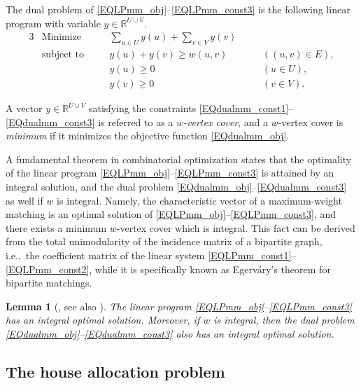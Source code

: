 \documentclass[11pt,a4paper,showkeys]{article}
\theoremstyle{plain}
\newtheorem{lemma}[theorem]{Lemma}
\theoremstyle{definition}
\newcommand{\RR}{{\mathbb{R}}}
\begin{document}
The dual problem of 
\eqref{EQLPmm_obj}--\eqref{EQLPmm_const3} is the following linear program with variable $y\in \RR^{U\cup V} $.
\begin{alignat}{3}
\label{EQdualmm_obj}
&\mbox{Minimize}    &\quad& \sum_{u\in U} y(u) + \sum_{v\in V} y(v)     && \\
\label{EQdualmm_const1}
&\mbox{subject to}  &\quad& y(u) + y(v) \ge w(u,v)                    &\quad& ((u,v)\in E),\\
\label{EQdualmm_const2}
&                   &\quad& y(u)\ge 0                                   &\quad& (u\in U), \\
\label{EQdualmm_const3}
&                   &\quad& y(v)\ge 0                                   &\quad& (v\in V).
\end{alignat}

A vector $y\in \RR^{U\cup V}$ satisfying the constraints \eqref{EQdualmm_const1}--\eqref{EQdualmm_const3} is referred to as a 
\emph{$w$-vertex cover}, 
and 
a $w$-vertex cover is \emph{minimum} if it minimizes the objective function \eqref{EQdualmm_obj}. 

A fundamental theorem in combinatorial optimization states that the optimality of the linear program \eqref{EQLPmm_obj}--\eqref{EQLPmm_const3} is attained by an integral solution, 
and 
the dual problem \eqref{EQdualmm_obj}--\eqref{EQdualmm_const3} as well if $w$ is integral. 
Namely, 
the characteristic vector of a maximum-weight matching is an optimal solution of \eqref{EQLPmm_obj}--\eqref{EQLPmm_const3}, 
and 
there exists a minimum $w$-vertex cover which is integral. 
This fact can be derived from the total unimodularity of the incidence matrix of a bipartite graph, i.e.,\ 
the coefficient matrix of the linear system \eqref{EQLPmm_const1}--\eqref{EQLPmm_const2}, 
while it is specifically known as Egerv\'ary's theorem \cite{Ege31} for bipartite matchings. 




\begin{lemma}[\cite{Ege31}, see also ]
\label{LEMintmm}
The linear program \eqref{EQLPmm_obj}--\eqref{EQLPmm_const3} has an integral optimal solution. 
Moreover, 
if $w$ is integral, 
then the dual problem \eqref{EQdualmm_obj}--\eqref{EQdualmm_const3} also has an integral optimal solution. 
\end{lemma}


\subsection{The house allocation problem}
\end{document}
